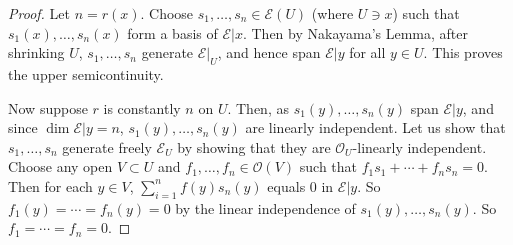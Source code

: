 \documentclass[12pt,a4paper,notitlepage]{article}
\theoremstyle{definition}
\theoremstyle{plain}
\newcommand{\scr}{\mathscr}
\numberwithin{equation}{section}
\begin{document}
\begin{proof}
Let $n=r(x)$. Choose $s_1,\dots,s_n\in\scr E(U)$ (where $U\ni x$) such that $s_1(x),\dots,s_n(x)$ form a basis of $\scr E|x$. Then by Nakayama's Lemma, after shrinking $U$, $s_1,\dots,s_n$ generate $\scr E|_U$, and hence span $\scr E|y$ for all $y\in U$. This proves the upper semicontinuity.

Now suppose $r$ is constantly $n$ on $U$. Then, as $s_1(y),\dots,s_n(y)$ span $\scr E|y$, and since $\dim\scr E|y=n$, $s_1(y),\dots,s_n(y)$ are linearly independent. Let us show that $s_1,\dots,s_n$ generate freely $\scr E_U$ by showing that they are $\scr O_U$-linearly independent. Choose any open $V\subset U$ and $f_1,\dots,f_n\in\scr O(V)$ such that $f_1s_1+\cdots+f_ns_n=0$. Then for each $y\in V$, $\sum_{i=1}^n f(y)s_n(y)$ equals $0$ in $\scr E|y$. So $f_1(y)=\cdots=f_n(y)=0$ by the linear independence of  $s_1(y),\dots,s_n(y)$. So $f_1=\cdots=f_n=0$.
\end{proof}
\end{document}
